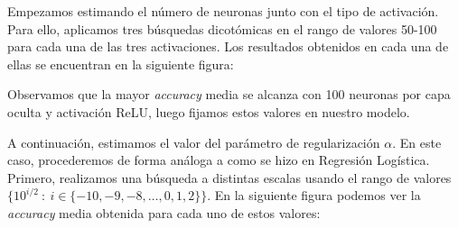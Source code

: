 \documentclass[a4]{article}
\begin{document}
Empezamos estimando el número de neuronas junto con el tipo de activación. Para ello, aplicamos tres búsquedas dicotómicas en el rango de valores 50-100 para cada una de las tres activaciones. Los resultados obtenidos en cada una de ellas se encuentran en la siguiente figura:

\begin{figure}[H]
    \centering
	\label{fig:mlp_cv1}
\end{figure}

Observamos que la mayor \textit{accuracy} media se alcanza con 100 neuronas por capa oculta y activación ReLU, luego fijamos estos valores en nuestro modelo.

A continuación, estimamos el valor del parámetro de regularización $\alpha$. En este caso, procederemos de forma análoga a como se hizo en Regresión Logística. Primero, realizamos una búsqueda a distintas escalas usando el rango de valores $\{10^{i/2} \ : \ i \in \{-10,-9,-8,\dots,0,1,2\} \}$.  En la siguiente figura podemos ver la \textit{accuracy} media obtenida para cada uno de estos valores:

\begin{figure}[H]
    \centering
	\label{fig:mlp_cv2}
\end{figure}
\end{document}
